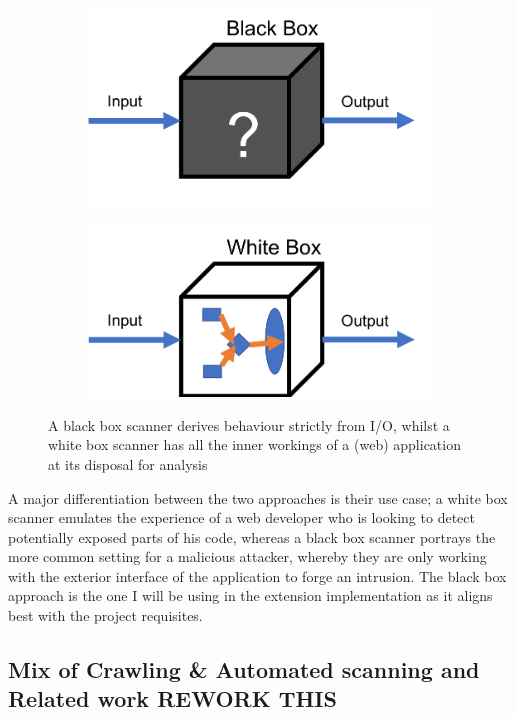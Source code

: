 \begin{figure}[h]
	\centering
	\begin{subfigure}{.5\textwidth}
		\centering
		\includegraphics[width=.8\linewidth]{images/black_box.png}
		\label{fig:blackBox}
	\end{subfigure}%
	\begin{subfigure}{.5\textwidth}
		\centering
		\includegraphics[width=.8\linewidth]{images/white_box.png}
		\label{fig:whiteBox}
	\end{subfigure}
	\caption{A black box scanner derives behaviour strictly from I/O, whilst a white box scanner has all the inner workings of a (web) application at its disposal for analysis}
	\label{fig:test}
\end{figure}


 A major differentiation between the two approaches is their use case; a white box scanner emulates the experience of a web developer who is looking to detect potentially exposed parts of his code, whereas a black box scanner portrays the more common setting for a malicious attacker, whereby they are only working with the exterior interface of the application to forge an intrusion. The black box approach is the one I will be using in the extension implementation as it aligns best with the project requisites.

\subsection{Mix of Crawling \& Automated scanning and Related work REWORK THIS}
 
